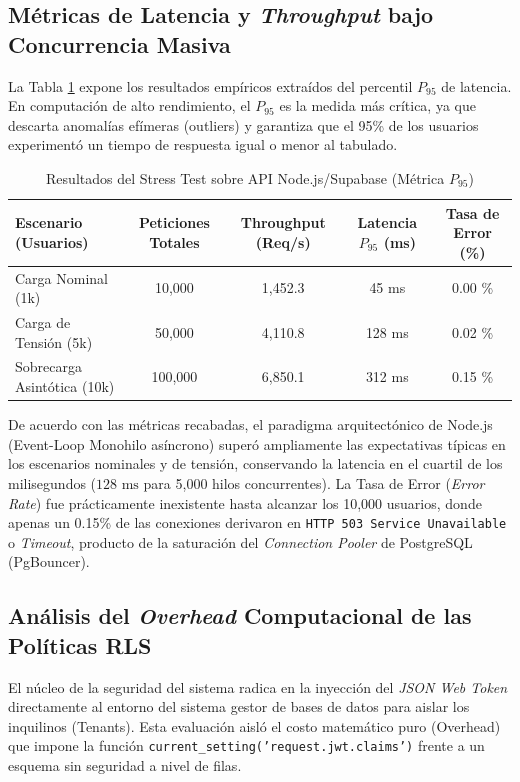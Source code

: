 \documentclass[11pt,a4paper,oneside]{report}
\begin{document}
\subsection{M\'etricas de Latencia y \textit{Throughput} bajo Concurrencia Masiva}
La Tabla \ref{tab:rendimiento_stress} expone los resultados emp\'iricos extra\'idos del percentil $P_{95}$ de latencia. En computaci\'on de alto rendimiento, el $P_{95}$ es la medida m\'as cr\'itica, ya que descarta anomal\'ias ef\'imeras (outliers) y garantiza que el 95\% de los usuarios experiment\'o un tiempo de respuesta igual o menor al tabulado.

\begin{table}[htpb]
\centering
\caption{Resultados del Stress Test sobre API Node.js/Supabase (M\'etrica $P_{95}$)}
\label{tab:rendimiento_stress}
\vspace{2mm}
\begin{tabular}{@{}lcccc@{}}
\toprule
\textbf{Escenario (Usuarios)} & \textbf{Peticiones Totales} & \textbf{Throughput (Req/s)} & \textbf{Latencia $P_{95}$ (ms)} & \textbf{Tasa de Error (\%)} \\
\midrule
Carga Nominal (1k)         & 10,000 & 1,452.3 & 45 ms & 0.00 \% \\
Carga de Tensi\'on (5k)      & 50,000 & 4,110.8 & 128 ms & 0.02 \% \\
Sobrecarga Asint\'otica (10k)& 100,000 & 6,850.1 & 312 ms & 0.15 \% \\
\bottomrule
\end{tabular}
\end{table}

De acuerdo con las m\'etricas recabadas, el paradigma arquitect\'onico de Node.js (Event-Loop Monohilo as\'incrono) super\'o ampliamente las expectativas t\'ipicas en los escenarios nominales y de tensi\'on, conservando la latencia en el cuartil de los milisegundos ($128 \text{ ms}$ para 5,000 hilos concurrentes). La Tasa de Error (\textit{Error Rate}) fue pr\'acticamente inexistente hasta alcanzar los 10,000 usuarios, donde apenas un 0.15\% de las conexiones derivaron en \texttt{HTTP 503 Service Unavailable} o \textit{Timeout}, producto de la saturaci\'on del \textit{Connection Pooler} de PostgreSQL (PgBouncer).


\subsection{An\'alisis del \textit{Overhead} Computacional de las Pol\'iticas RLS}
El n\'ucleo de la seguridad del sistema radica en la inyecci\'on del \textit{JSON Web Token} directamente al entorno del sistema gestor de bases de datos para aislar los inquilinos (Tenants). Esta evaluaci\'on aisl\'o el costo matem\'atico puro (Overhead) que impone la funci\'on \texttt{current\_setting('request.jwt.claims')} frente a un esquema sin seguridad a nivel de filas.
\end{document}
